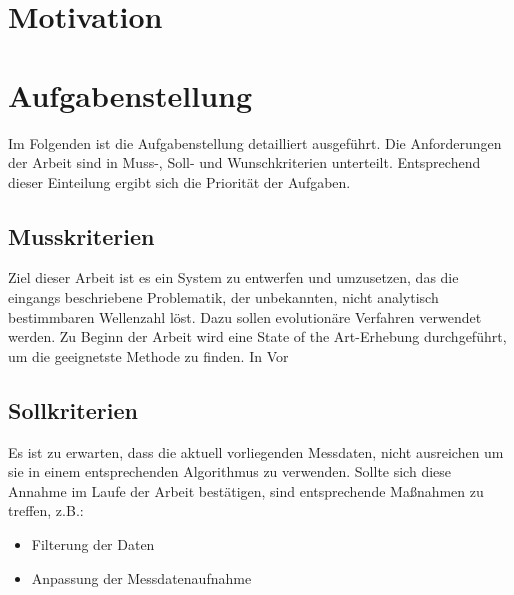 \documentclass[a4paper,12pt,fleqn]{article}
\begin{document}
\setlength{\headheight}{36pt}

\begin{titlepage}



\end{titlepage}

\begin{abstract}

\end{abstract}

\tableofcontents
\newpage

\section{Motivation}


\section{Aufgabenstellung}
Im Folgenden ist die Aufgabenstellung detailliert ausgeführt. Die Anforderungen der Arbeit sind in Muss-, Soll- und Wunschkriterien unterteilt. Entsprechend dieser Einteilung ergibt sich die Priorität der Aufgaben.

\subsection{Musskriterien}
Ziel dieser Arbeit ist es ein System zu entwerfen und umzusetzen, das die eingangs beschriebene Problematik, der unbekannten, nicht analytisch bestimmbaren Wellenzahl löst. Dazu sollen evolutionäre Verfahren verwendet werden. Zu Beginn der Arbeit wird eine State of the Art-Erhebung durchgeführt, um die geeignetste Methode zu finden. In Vor

\subsection{Sollkriterien}
Es ist zu erwarten, dass die aktuell vorliegenden Messdaten, nicht ausreichen um sie in einem entsprechenden Algorithmus zu verwenden. Sollte sich diese Annahme im Laufe der Arbeit bestätigen, sind entsprechende Maßnahmen zu treffen, z.B.:
\begin{itemize}
\item Filterung der Daten
\item Anpassung der Messdatenaufnahme
\end{itemize}
\end{document}
